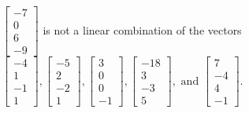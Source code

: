 \begin{exercise}
\begin{exerciseStatement}
  \end{exerciseStatement}
  \begin{exerciseAnswer}
   \(\left[\begin{array}{c}
-7 \\
0 \\
6 \\
-9
\end{array}\right]\) 
  	 is not  
	a linear combination of the vectors \(\left[\begin{array}{c}
-4 \\
1 \\
-1 \\
1
\end{array}\right] , \left[\begin{array}{c}
-5 \\
2 \\
-2 \\
1
\end{array}\right] , \left[\begin{array}{c}
3 \\
0 \\
0 \\
-1
\end{array}\right] , \left[\begin{array}{c}
-18 \\
3 \\
-3 \\
5
\end{array}\right] , \text{ and } \left[\begin{array}{c}
7 \\
-4 \\
4 \\
-1
\end{array}\right]\).

	
  


  \end{exerciseAnswer}
\end{exercise}